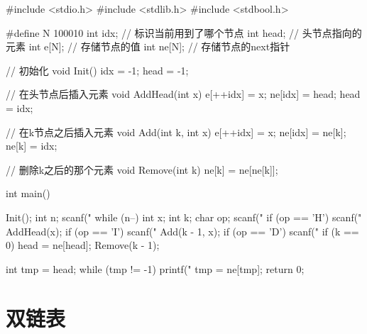 \begin{mycpptwocol}
#include <stdio.h>
#include <stdlib.h>
#include <stdbool.h>

#define N 100010
int idx; // 标识当前用到了哪个节点
int head; // 头节点指向的元素
int e[N]; // 存储节点的值
int ne[N]; // 存储节点的next指针

// 初始化
void Init()
{
    idx = -1;
    head = -1;
}
    
// 在头节点后插入元素
void AddHead(int x) {
    e[++idx] = x;
    ne[idx] = head;
    head = idx;
}

// 在k节点之后插入元素
void Add(int k, int x)
{
    e[++idx] = x;
    ne[idx] = ne[k];
    ne[k] = idx;
}

// 删除k之后的那个元素
void Remove(int k) {
    ne[k] = ne[ne[k]];
}

int main()
{
    Init();
    int n;
    scanf("%
    while (n--) {
        int x;
        int k;
        char op;
        scanf(" %
        if (op == 'H') {
            scanf("%
            AddHead(x);
        }
        if (op == 'I') {
            scanf("%
            Add(k - 1, x);
        }
        if (op == 'D') {
            scanf("%
            if (k == 0) {
                head = ne[head];
            }
            Remove(k - 1);
        }
    }

    int tmp = head;
    while (tmp != -1) {
        printf("%
        tmp = ne[tmp];
    }
    return 0;
}
\end{mycpptwocol}

\section{双链表}

